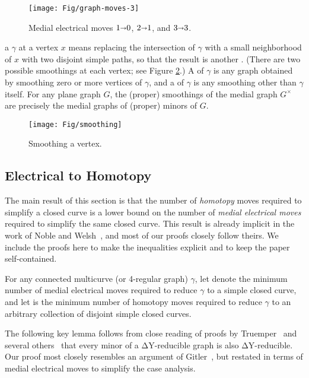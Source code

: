 \documentclass[11pt,twoside]{article}
\def\arcto{\mathord\shortrightarrow}
\def\arc#1#2{#1\arcto#2}
\let\EDIT\relax
\numberwithin{figure}{section}
\begin{document}
\begin{figure}[ht]
\centering
\texttt{[image: Fig/graph-moves-3]}\\
\caption{Medial electrical moves $\arc10$, $\arc21$, and $\arc33$.}
\label{F:medial-elec}
\end{figure}

 a \EDIT{multicurve} $γ$ at a vertex $x$ means replacing the intersection of $γ$ with a small neighborhood of $x$ with two disjoint simple paths, so that the result is another \EDIT{multicurve}. (There are two possible smoothings at each vertex; see Figure \ref{F:smoothing}.)  A  of $γ$ is any graph obtained by smoothing zero or more vertices of $γ$, and a  of $γ$ is any smoothing other than $\gamma$ itself. For any plane graph $G$, the (proper) smoothings of the medial graph $G^\times$ are precisely the medial graphs of (proper) minors of $G$.

\begin{figure}[ht]
\centering
\texttt{[image: Fig/smoothing]}
\caption{Smoothing a vertex.}
\label{F:smoothing}
\end{figure}

\subsection{Electrical to Homotopy}

The main result of this section is that the number of \emph{homotopy} moves required to simplify a closed curve is a lower bound on the number of \emph{medial electrical moves} required to simplify the same closed curve.  This result is already implicit in the work of Noble and Welsh~\cite{nw-kg-00}, and most of our proofs closely follow theirs.  We include the proofs here to make the inequalities explicit and to keep the paper self-contained.

For any connected multicurve (or 4-regular \EDIT{plane} graph) $\gamma$, let  denote the minimum number of medial electrical moves required to reduce $γ$ to a simple closed curve, and let  is the minimum number of homotopy moves required to reduce $γ$ to an arbitrary collection of disjoint simple closed curves.

The following key lemma follows from close reading of proofs by Truemper~\cite[Lemma~4]{t-drpg-89} and several others~\cite{g-dtaa-91,nt-aafts-96,acgp-frpwg-00,nw-kg-00} that every minor of a ΔY-reducible graph is also ΔY-reducible.  Our proof most closely resembles an argument of Gitler~\cite[Lemma~2.3.3]{g-dtaa-91}, but restated in terms of medial electrical moves to simplify the case analysis.
\end{document}
